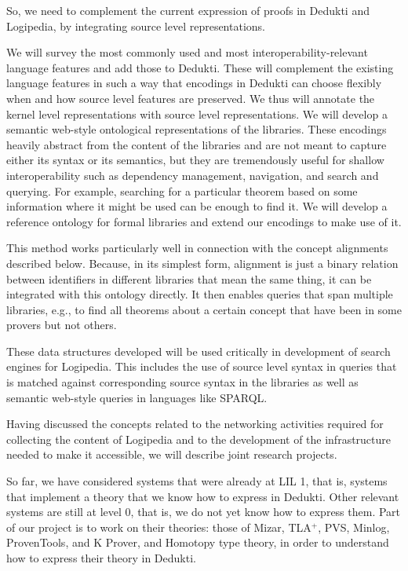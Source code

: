 So, we need to complement the current expression of proofs in Dedukti
and Logipedia, by integrating source level representations.

We will survey the most commonly used and most
interoperability-relevant language features and add those to Dedukti.
These will complement the existing language features in such a way
that encodings in Dedukti can choose flexibly when and how source
level features are preserved.  We thus will annotate the kernel level
representations with source level representations.  We will develop a
semantic web-style ontological representations of the libraries.
These encodings heavily abstract from the content of the libraries and
are not meant to capture either its syntax or its semantics, but they
are tremendously useful for shallow interoperability such as
dependency management, navigation, and search and querying.  For
example, searching for a particular theorem based on some information
where it might be used can be enough to find it.  We will develop a
reference ontology for formal libraries and extend our encodings to
make use of it.

This method works particularly well in connection with the concept alignments
described below. Because, in its simplest form, alignment is just a
binary relation between identifiers in different libraries that mean
the same thing, it can be integrated with this ontology directly.  It
then enables queries that span multiple libraries, e.g., to find all
theorems about a certain concept that have been in some provers but not
others.

These data structures developed will be used
critically in development of search engines for Logipedia.  This
includes the use of source level syntax in queries that is matched
against corresponding source syntax in the libraries as well as
semantic web-style queries in languages like SPARQL.


Having discussed the concepts related to the networking activities
required for collecting the content of Logipedia and to the
development of the infrastructure needed to make it accessible, we
will describe joint research projects.

So far, we have considered systems that were already at LIL 1, that
is, systems that implement a theory that we know how to express in
Dedukti.  Other relevant systems are still at level 0, that is, we do
not yet know how to express them. Part of our project is to work on
their theories: those of Mizar, TLA$^+$, PVS, Minlog, ProvenTools, and
K Prover, and Homotopy type theory, in order to understand how
to express their theory in Dedukti.

